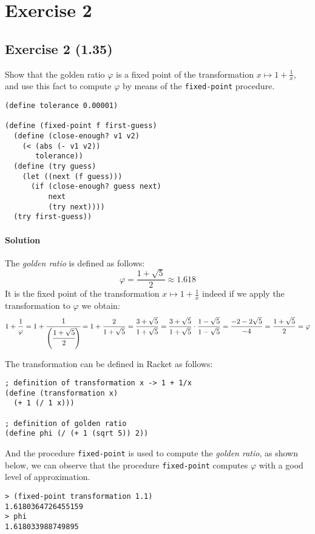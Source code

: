 \section*{Exercise 2}

\subsection*{Exercise 2 (1.35)}
Show that the golden ratio $ \varphi $ is a fixed point of the transformation $ x \mapsto 1 + \frac{1}{x} $, and use this fact
to compute $ \varphi $ by means of the \texttt{fixed-point} procedure.

\begin{lstlisting}
(define tolerance 0.00001)

(define (fixed-point f first-guess)
  (define (close-enough? v1 v2)
    (< (abs (- v1 v2))
       tolerance))
  (define (try guess)
    (let ((next (f guess)))
      (if (close-enough? guess next)
          next
          (try next))))
  (try first-guess))
\end{lstlisting}

\paragraph{Solution}
The \textit{golden ratio} is defined as follows: \[ \varphi = \frac{1 + \sqrt{5}}{2} \approx 1.618 \]
It is the fixed point of the transformation $ x \mapsto 1 + \frac{1}{x} $ indeed if we apply the transformation to $ \varphi $
we obtain:
\[ 
    1 + \frac{1}{\varphi} = 1 + \cfrac{1}{\left( \cfrac{1 + \sqrt{5}}{2} \right) } = 1 + \frac{2}{1 + \sqrt{5}} = 
    \frac{3 + \sqrt{5}}{1 + \sqrt{5}} = \frac{3 + \sqrt{5}}{1 + \sqrt{5}} \cdot \frac{1 - \sqrt{5}}{1 - \sqrt{5}} = 
    \frac{-2 - 2\sqrt{5}}{-4} = \frac{1 + \sqrt{5}}{2} = \varphi
\]

The transformation can be defined in Racket as follows:
\begin{lstlisting}
; definition of transformation x -> 1 + 1/x
(define (transformation x)
  (+ 1 (/ 1 x)))

; definition of golden ratio
(define phi (/ (+ 1 (sqrt 5)) 2))
\end{lstlisting}
And the procedure \texttt{fixed-point} is used to compute the \textit{golden ratio}, as shown below, we can observe that the procedure
\texttt{fixed-point} computes $ \varphi $ with a good level of approximation.
\begin{lstlisting}
> (fixed-point transformation 1.1)
1.6180364726455159
> phi
1.618033988749895
\end{lstlisting}

